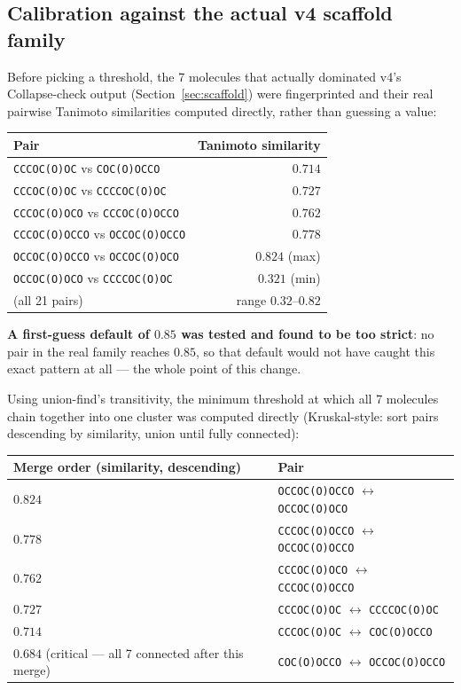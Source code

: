 \documentclass[11pt]{article}
\newcommand{\code}[1]{\texttt{#1}}
\begin{document}
\subsection{Calibration against the actual v4 scaffold family}

Before picking a threshold, the 7 molecules that actually dominated v4's Collapse-check output (Section~\ref{sec:scaffold}) were fingerprinted and their real pairwise Tanimoto similarities computed directly, rather than guessing a value:

\begin{center}
\begin{tabular}{@{}l r@{}}
\toprule
\textbf{Pair} & \textbf{Tanimoto similarity} \\
\midrule
\code{CCCOC(O)OC} vs \code{COC(O)OCCO} & $0.714$ \\
\code{CCCOC(O)OC} vs \code{CCCCOC(O)OC} & $0.727$ \\
\code{CCCOC(O)OCO} vs \code{CCCOC(O)OCCO} & $0.762$ \\
\code{CCCOC(O)OCCO} vs \code{OCCOC(O)OCCO} & $0.778$ \\
\code{OCCOC(O)OCCO} vs \code{OCCOC(O)OCO} & $0.824$ (max) \\
\code{OCCOC(O)OCO} vs \code{CCCCOC(O)OC} & $0.321$ (min) \\
(all 21 pairs) & range $0.32$--$0.82$ \\
\bottomrule
\end{tabular}
\end{center}

\textbf{A first-guess default of $0.85$ was tested and found to be too strict}: no pair in the real family reaches $0.85$, so that default would not have caught this exact pattern at all --- the whole point of this change.

Using union-find's transitivity, the minimum threshold at which all 7 molecules chain together into one cluster was computed directly (Kruskal-style: sort pairs descending by similarity, union until fully connected):

\begin{center}
\begin{tabular}{@{}l l@{}}
\toprule
\textbf{Merge order (similarity, descending)} & \textbf{Pair} \\
\midrule
$0.824$ & \code{OCCOC(O)OCCO} $\leftrightarrow$ \code{OCCOC(O)OCO} \\
$0.778$ & \code{CCCOC(O)OCCO} $\leftrightarrow$ \code{OCCOC(O)OCCO} \\
$0.762$ & \code{CCCOC(O)OCO} $\leftrightarrow$ \code{CCCOC(O)OCCO} \\
$0.727$ & \code{CCCOC(O)OC} $\leftrightarrow$ \code{CCCCOC(O)OC} \\
$0.714$ & \code{CCCOC(O)OC} $\leftrightarrow$ \code{COC(O)OCCO} \\
$\mathbf{0.684}$ (critical --- all 7 connected after this merge) & \code{COC(O)OCCO} $\leftrightarrow$ \code{OCCOC(O)OCCO} \\
\bottomrule
\end{tabular}
\end{center}
\end{document}
